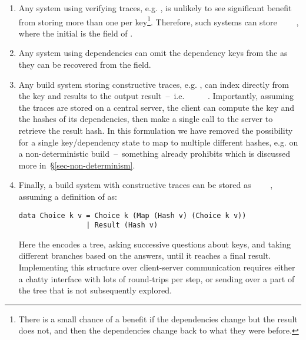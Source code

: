 \begin{enumerate}
\item Any system using verifying traces, e.g. \Shake, is unlikely to see significant benefit from storing more than one  per key\footnote{There is a small chance of a benefit if the dependencies change but the result does not, and then the dependencies change back to what they were before.}. Therefore, such systems can store ~~~~, where the initial  is the  field of .
\item Any system using  dependencies can omit the dependency keys from the  as they can be recovered from the  field.
\item Any  build system storing constructive traces, e.g. \Bazel, can index directly from the key and results to the output result~--~i.e. ~~\hs{[Hash}~\hs{v])}~~. Importantly, assuming the traces are stored on a central server, the client can compute the key and the hashes of its dependencies, then make a single call to the server to retrieve the result hash. In this formulation we have removed the possibility for a single key/dependency state to map to multiple different hashes, e.g. on a non-deterministic build~--~something \Bazel already prohibits which is discussed more in~\S\ref{sec-non-determinism}.
\item Finally, a  build system with constructive traces can be stored as ~~~~, assuming a definition of  as:
\begin{verbatim}
data Choice k v = Choice k (Map (Hash v) (Choice k v))
                | Result (Hash v)
\end{verbatim}
Here the  encodes a tree, asking successive questions about keys, and taking different branches based on the answers, until it reaches a final result. Implementing this structure over client-server communication requires either a chatty interface with lots of round-trips per  step, or sending over a part of the tree that is not subsequently explored.
\end{enumerate}
